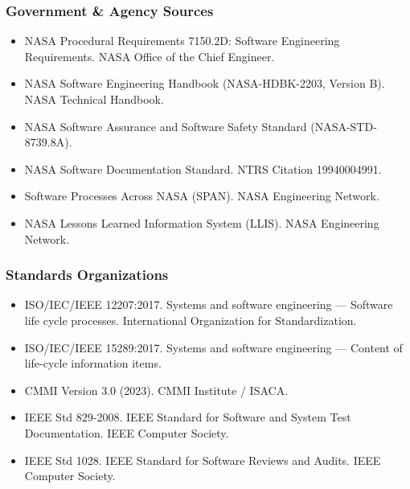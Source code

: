 \documentclass[11pt,letterpaper]{article}
\begin{document}
\subsubsection{Government \& Agency Sources}
\begin{itemize}[leftmargin=1.5em]
  \item NASA Procedural Requirements 7150.2D: Software Engineering Requirements. NASA Office of the Chief Engineer.
  \item NASA Software Engineering Handbook (NASA-HDBK-2203, Version B). NASA Technical Handbook.
  \item NASA Software Assurance and Software Safety Standard (NASA-STD-8739.8A).
  \item NASA Software Documentation Standard. NTRS Citation 19940004991.
  \item Software Processes Across NASA (SPAN). NASA Engineering Network.
  \item NASA Lessons Learned Information System (LLIS). NASA Engineering Network.
\end{itemize}

\subsubsection{Standards Organizations}
\begin{itemize}[leftmargin=1.5em]
  \item ISO/IEC/IEEE 12207:2017. Systems and software engineering — Software life cycle processes. International Organization for Standardization.
  \item ISO/IEC/IEEE 15289:2017. Systems and software engineering — Content of life-cycle information items.
  \item CMMI Version 3.0 (2023). CMMI Institute / ISACA.
  \item IEEE Std 829-2008. IEEE Standard for Software and System Test Documentation. IEEE Computer Society.
  \item IEEE Std 1028. IEEE Standard for Software Reviews and Audits. IEEE Computer Society.
\end{itemize}
\end{document}

